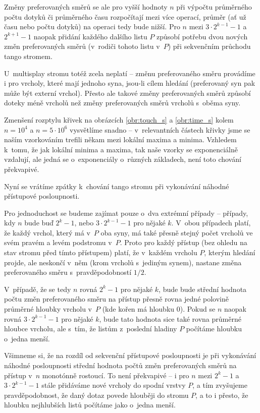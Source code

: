 Změny preferovaných směrů se ale pro vyšší hodnoty $n$ při výpočtu
průměrného počtu dotyků či průměrného času rozpočítají mezi více operací,
průměr (ať už času nebo počtu dotyků) na operaci tedy bude nižší. Pro $n$
 mezi $3\cdot 2^{k-1}-1$ a $2^{k+1}-1$ naopak přidání každého dalšího listu $P$ způsobí potřebu dvou nových změn preferovaných směrů (v~rodiči tohoto listu v~$P$) při sekvenčním průchodu tango stromem.

U~multisplay stromu totéž zcela neplatí -- změnu preferovaného směru
provádíme i pro vrcholy, které mají jednoho syna, jsou-li cílem hledání
(preferovaný syn pak může být externí vrchol). Přesto ale takové změny
preferovaných směrů způsobí doteky méně vrcholů než změny preferovaných směrů vrcholů s~oběma syny.

Zmenšení rozptylu křivek na obrázcích \ref{obr:touch_s} a \ref{obr:time_s}
kolem $n= 10^4$ a $n=5\cdot 10^6$ vysvětlíme snadno -- v~relevantních
částech křivky jsme se naším vzorkováním trefili někam mezi lokální maxima a
minima. Vzhledem k~tomu, že jak lokální minima a maxima, tak naše vzorky se
exponenciálně vzdalují, ale jedná se o~exponenciály o~různých základech, není
toto chování překvapivé.

Nyní se vrátíme zpátky k~chování tango stromu při vykonávání náhodné přístupové
posloupnosti.

Pro jednoduchost se budeme zajímat pouze o~dva extrémní případy --
případy, kdy $n$ bude buď $2^k-1$, nebo $3\cdot 2^{k-1} - 1$ pro nějaké $k$. V~obou
případech platí, že každý vrchol, který má v~$P$ oba syny, má také přesně
stejný počet vrcholů ve svém pravém a levém podstromu v~$P$. Proto pro každý
přístup (bez ohledu na stav stromu před tímto přístupem) platí, že v~každém
vrcholu $P$, kterým hledání projde, ale neskončí v~něm (krom vrcholů s~jediným
synem), nastane změna preferovaného směru s~pravděpodobností $1/2$.

V~případě, že se tedy $n$ rovná $2^k-1$ pro nějaké $k$, bude bude střední
hodnota počtu změn preferovaného směru na přístup přesně rovna jedné polovině
průměrné hloubky vrcholu v~$P$ (kde kořen má hloubku 0). Pokud se $n$ naopak rovná
$3\cdot2^{k-1}-1$ pro nějaké $k$, bude tato hodnota sice také rovna průměrné
hloubce vrcholu, ale s~tím, že listům z~poslední hladiny $P$ počítáme hloubku o~jedna menší.

Všimneme si, že na rozdíl od sekvenční přístupové posloupnosti je při vykonávání náhodné
posloupnosti střední hodnota počtů změn preferovaných směrů na přístup v~$n$
monotónně rostoucí. To není překvapivé -- i pro $n$ mezi $2^k-1$ a $3\cdot
2^{k-1}-1$ stále přidáváme nové vrcholy do spodní vrstvy $P$, a tím zvyšujeme
pravděpodobnost, že daný dotaz povede hlouběji do stromu $P$, a to i přesto, že
hloubku nejhlubších listů počítáme jako o~jedna menší.

